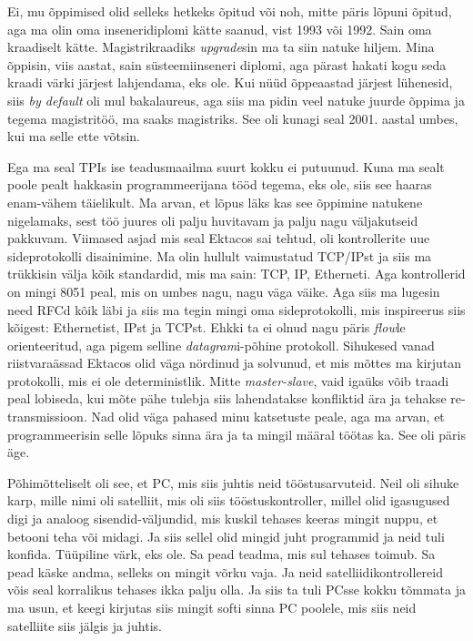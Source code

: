 Ei, mu õppimised olid selleks hetkeks õpitud või noh, mitte päris lõpuni 
õpitud, aga ma olin oma inseneridiplomi kätte saanud, vist 1993 või 1992. Sain 
oma kraadiselt kätte. Magistrikraadiks \emph{upgrade}sin ma ta siin natuke 
hiljem. Mina õppisin, viis aastat, sain süsteemiinseneri diplomi, aga pärast 
hakati  kogu seda kraadi värki järjest lahjendama, eks ole. Kui nüüd õppeaastad 
järjest lühenesid, siis \emph{by default} oli mul bakalaureus, aga siis ma 
pidin veel natuke juurde õppima ja tegema magistritöö, ma saaks magistriks. See 
oli kunagi seal 2001. aastal umbes, kui ma selle  ette võtsin. 


Ega ma seal TPIs ise teadusmaailma suurt kokku ei putuunud. Kuna ma sealt poole 
pealt hakkasin programmeerijana tööd tegema, eks ole, siis see  haaras  
enam-vähem täielikult. Ma arvan, et lõpus läks kas see õppimine natukene 
nigelamaks, sest töö juures oli palju huvitavam ja palju nagu väljakutseid 
pakkuvam. Viimased asjad mis seal Ektacos sai tehtud, oli 
kontrollerite uue sideprotokolli disainimine. Ma olin hullult vaimustatud 
TCP/IPst ja  siis ma trükkisin välja kõik standardid, mis ma sain: TCP, IP, 
Etherneti. Aga kontrollerid on mingi 8051 peal, mis on umbes nagu, nagu väga 
väike. Aga siis ma lugesin need RFCd kõik läbi ja siis ma tegin mingi oma 
sideprotokolli, mis inspireerus siis kõigest: Ethernetist, IPst ja TCPst. Ehkki 
ta ei olnud nagu päris \emph{flow}le orienteeritud, aga pigem  selline 
\emph{datagram}i-põhine protokoll. Sihukesed vanad riistvaraässad Ektacos  olid 
väga nördinud ja solvunud, et mis mõttes ma kirjutan protokolli, mis ei ole 
deterministlik. Mitte \emph{master-slave}, vaid igaüks võib traadi peal 
lobiseda, kui mõte pähe tulebja siis lahendatakse konfliktid ära ja tehakse 
re-transmissioon. Nad olid väga pahased minu katsetuste peale, aga ma arvan, et 
programmeerisin selle lõpuks sinna ära ja ta mingil määral töötas ka. See oli 
päris äge.


Põhimõtteliselt oli see, et PC, mis siis juhtis neid tööstusarvuteid. Neil oli 
sihuke karp, mille nimi oli satelliit, mis oli siis tööstuskontroller, millel 
olid igasugused digi ja analoog sisendid-väljundid, mis  kuskil tehases keeras 
mingit nuppu, et betooni teha või midagi. Ja siis sellel olid mingid juht 
programmid ja neid tuli  konfida. Tüüpiline värk, eks ole. Sa pead teadma, mis 
sul tehases toimub. Sa pead käske andma, selleks on mingit võrku vaja. Ja neid 
satelliidikontrollereid võis seal korralikus tehases ikka palju olla. Ja siis 
ta tuli PCsse kokku tõmmata ja ma usun, et keegi kirjutas siis mingit softi 
sinna PC poolele, mis siis neid satelliite siis jälgis ja juhtis.

